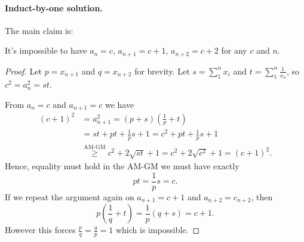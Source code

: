 \documentclass[11pt]{scrartcl}
\begin{document}
\paragraph{Induct-by-one solution.}
The main claim is:
\begin{claim*}
  It's impossible to have
  $a_n = c$, $a_{n+1} = c+1$, $a_{n+2} = c+2$ for any $c$ and $n$.
\end{claim*}
\begin{proof}
  Let $p = x_{n+1}$ and $q = x_{n+2}$ for brevity.
  Let $s = \sum_1^n x_i$ and $t = \sum_1^n \frac{1}{x_n}$, so $c^2 = a_n^2 = st$.

  From $a_n = c$ and $a_{n+1} = c$ we have
  \begin{align*}
    (c+1)^2 &= a_{n+1}^2 = (p+s)\left( \frac 1p+t \right) \\
    &= st + pt + \frac1ps + 1 = c^2 + pt + \frac1ps + 1 \\
    &\overset{\text{AM-GM}}{\geq} c^2 + 2\sqrt{st} + 1 = c^2 + 2\sqrt{c^2} + 1 = (c+1)^2.
  \end{align*}
  Hence, equality must hold in the AM-GM we must have exactly
  \[ p t = \frac 1p s = c. \]
  If we repeat the argument again on $a_{n+1}=c+1$ and $a_{n+2}=c_{n+2}$, then
  \[ p \left( \frac 1q + t \right) = \frac 1p \left( q + s \right) = c + 1. \]
  However this forces $\frac pq = \frac qp = 1$ which is impossible.
\end{proof}
\pagebreak
\end{document}
